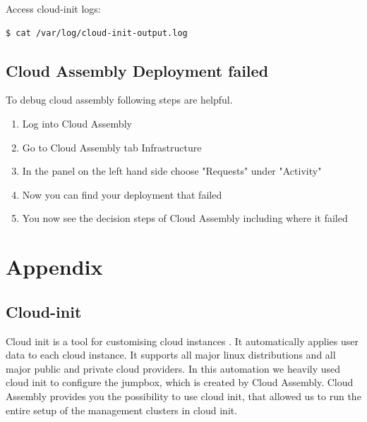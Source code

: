 \documentclass{article}
\begin{document}
Access cloud-init logs:
\begin{lstlisting}[language=bash]
  $ cat /var/log/cloud-init-output.log
\end{lstlisting}

\subsection{Cloud Assembly Deployment failed}
To debug cloud assembly following steps are helpful. 

\begin{enumerate}
  \item Log into Cloud Assembly
  \item Go to Cloud Assembly tab Infrastructure
  \item In the panel on the left hand side choose "Requests" under "Activity"
  \item Now you can find your deployment that failed
  \item You now see the decision steps of Cloud Assembly including where it failed
\end{enumerate}



\section{Appendix}

\subsection{Cloud-init}

Cloud init is a tool for customising cloud instances \citep{cloudinit}. It automatically applies user data to each cloud instance. It supports all major linux distributions and all major public and private cloud providers. In this automation we heavily used cloud init to configure the jumpbox, which is created by Cloud Assembly. Cloud Assembly provides you the possibility to use cloud init, that allowed us to run the entire setup of the management clusters in cloud init. 






\end{document}
